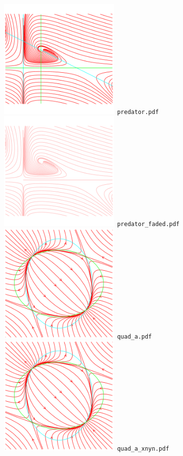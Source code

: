 \documentclass[a4paper]{amsart}
\begin{document}
\includegraphics[width=6cm]{predator.pdf}\verb+ predator.pdf+\\
\includegraphics[width=6cm]{predator_faded.pdf}\verb+ predator_faded.pdf+\\
\includegraphics[width=6cm]{quad_a.pdf}\verb+ quad_a.pdf+\\
\includegraphics[width=6cm]{quad_a_xnyn.pdf}\verb+ quad_a_xnyn.pdf+\\
\end{document}
